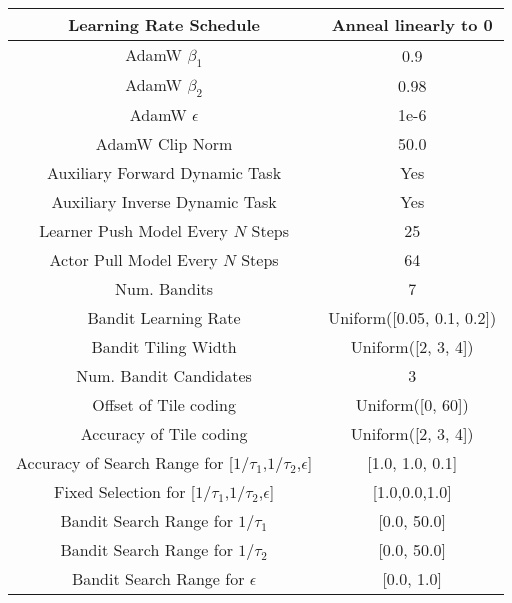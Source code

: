 \begin{table}[H]
\begin{center}
\begin{tabular}{|c|c|}
\hline
Learning Rate Schedule & Anneal linearly to 0 \\
\hline
AdamW $\beta_1$ & 0.9 \\
\hline
AdamW $\beta_2$ & 0.98 \\
\hline
AdamW $\epsilon$ & 1e-6 \\
\hline
AdamW Clip Norm & 50.0 \\
\hline
Auxiliary Forward Dynamic Task & Yes \\
\hline
Auxiliary Inverse Dynamic Task & Yes \\
\hline
Learner Push Model Every $N$ Steps & 25 \\
\hline
Actor Pull Model Every $N$ Steps & 64 \\
\hline
Num. Bandits & 7 \\
\hline
Bandit Learning Rate & Uniform([0.05, 0.1, 0.2]) \\
\hline
Bandit Tiling Width & Uniform([2, 3, 4]) \\
\hline
Num. Bandit Candidates & 3 \\
\hline
Offset of Tile coding & Uniform([0, 60]) \\
\hline
Accuracy of Tile coding & Uniform([2, 3, 4]) \\
\hline
Accuracy of Search Range for [$1/\tau_1$,$1/\tau_2$,$\epsilon$]& [1.0, 1.0, 0.1]\\
\hline
Fixed Selection for [$1/\tau_1$,$1/\tau_2$,$\epsilon$]&[1.0,0.0,1.0]\\
\hline
Bandit Search Range for $1/\tau_1$ & [0.0, 50.0] \\
\hline
Bandit Search Range for $1/\tau_2$ & [0.0, 50.0] \\
\hline
Bandit Search Range for $\epsilon$ & [0.0, 1.0] \\
\hline
\end{tabular}
\end{center}
\end{table}
\clearpage

